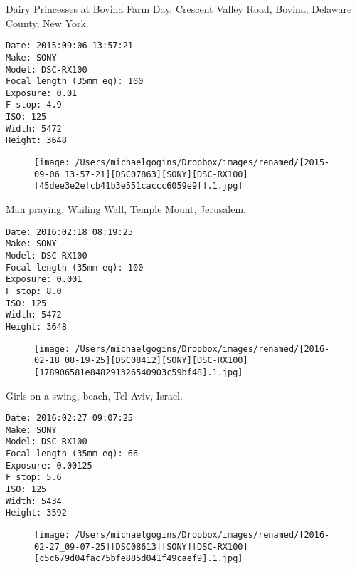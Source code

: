 \documentclass[11pt,letter,DIV=14,paper=landscape]{scrbook}
\begin{document}
\clearpage
\noindent Dairy Princesses at Bovina Farm Day, Crescent Valley Road, Bovina, Delaware County, New York.
\noindent
\begin{lstlisting}
Date: 2015:09:06 13:57:21
Make: SONY
Model: DSC-RX100
Focal length (35mm eq): 100
Exposure: 0.01
F stop: 4.9
ISO: 125
Width: 5472
Height: 3648
\end{lstlisting}
\clearpage

\begin{figure}
\texttt{[image: /Users/michaelgogins/Dropbox/images/renamed/[2015-09-06\_13-57-21][DSC07863][SONY][DSC-RX100][45dee3e2efcb41b3e551caccc6059e9f].1.jpg]}
\end{figure}
    
\clearpage
\noindent Man praying, Wailing Wall, Temple Mount, Jerusalem.
\noindent
\begin{lstlisting}
Date: 2016:02:18 08:19:25
Make: SONY
Model: DSC-RX100
Focal length (35mm eq): 100
Exposure: 0.001
F stop: 8.0
ISO: 125
Width: 5472
Height: 3648
\end{lstlisting}
\clearpage

\begin{figure}
\texttt{[image: /Users/michaelgogins/Dropbox/images/renamed/[2016-02-18\_08-19-25][DSC08412][SONY][DSC-RX100][178906581e848291326540903c59bf48].1.jpg]}
\end{figure}
    
\clearpage
\noindent Girls on a swing, beach, Tel Aviv, Israel.
\noindent
\begin{lstlisting}
Date: 2016:02:27 09:07:25
Make: SONY
Model: DSC-RX100
Focal length (35mm eq): 66
Exposure: 0.00125
F stop: 5.6
ISO: 125
Width: 5434
Height: 3592
\end{lstlisting}
\clearpage

\begin{figure}
\texttt{[image: /Users/michaelgogins/Dropbox/images/renamed/[2016-02-27\_09-07-25][DSC08613][SONY][DSC-RX100][c5c679d04fac75bfe885d041f49caef9].1.jpg]}
\end{figure}
    
\end{document}
